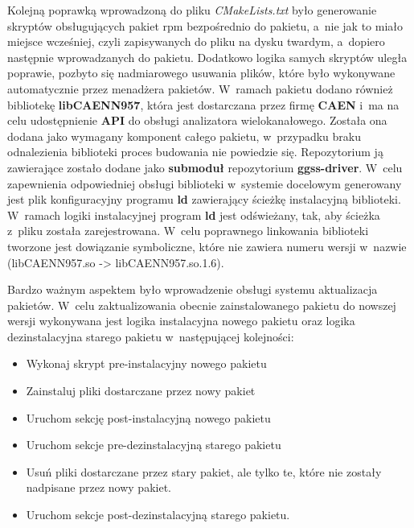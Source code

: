 Kolejną poprawką wprowadzoną do pliku \textit{CMakeLists.txt} było generowanie skryptów obsługujących pakiet \gls*{rpm} bezpośrednio do pakietu, a~nie jak to miało miejsce wcześniej, czyli zapisywanych do pliku na dysku twardym, a~dopiero następnie wprowadzanych do pakietu. Dodatkowo logika samych skryptów uległa poprawie, pozbyto się nadmiarowego usuwania plików, które było wykonywane automatycznie przez menadżera pakietów. W~ramach pakietu dodano również bibliotekę \textbf{libCAENN957}, która jest dostarczana przez firmę \textbf{CAEN} i~ma na celu udostępnienie \textbf{API} do obsługi analizatora wielokanałowego. Została ona dodana jako wymagany komponent całego pakietu, w~przypadku braku odnalezienia biblioteki proces budowania nie powiedzie się. Repozytorium ją zawierające zostało dodane jako \textbf{submoduł} repozytorium \textbf{ggss-driver}. W~celu zapewnienia odpowiedniej obsługi biblioteki w~systemie docelowym generowany jest plik konfiguracyjny programu \textbf{ld} zawierający ścieżkę instalacyjną biblioteki. W~ramach logiki instalacyjnej program \textbf{ld} jest odświeżany, tak, aby ścieżka z~pliku została zarejestrowana. W~celu poprawnego linkowania biblioteki tworzone jest dowiązanie symboliczne, które nie zawiera numeru wersji w~nazwie (libCAENN957.so -> libCAENN957.so.1.6).

Bardzo ważnym aspektem było wprowadzenie obsługi systemu aktualizacja pakietów. W~celu zaktualizowania obecnie zainstalowanego pakietu do nowszej wersji wykonywana jest logika instalacyjna nowego pakietu oraz logika dezinstalacyjna starego pakietu w~następującej kolejności:
\begin{itemize}
\item Wykonaj skrypt pre-instalacyjny nowego pakietu
\item Zainstaluj pliki dostarczane przez nowy pakiet
\item Uruchom sekcję post-instalacyjną nowego pakietu
\item Uruchom sekcje pre-dezinstalacyjną starego pakietu
\item Usuń pliki dostarczane przez stary pakiet, ale tylko te, które nie zostały nadpisane przez nowy pakiet.
\item Uruchom sekcje post-dezinstalacyjną starego pakietu. \cite{RPMUpgrade}
\end{itemize}


